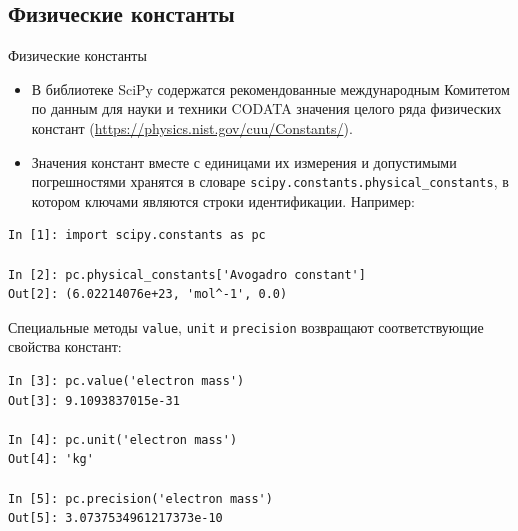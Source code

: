 \documentclass[aspectratio=169, mathserif]{beamer}	%
\begin{document}
\subsection{Физические константы}
\begin{frame}[fragile]{Физические константы}
\scriptsize
\begin{itemize}
	\item В библиотеке SciPy содержатся рекомендованные международным Комитетом по данным для науки и техники CODATA значения целого ряда физических констант (\url{https://physics.nist.gov/cuu/Constants/}).
	\item Значения констант вместе с единицами их измерения и допустимыми погрешностями хранятся в словаре \texttt{scipy.constants.physical\_constants}, в котором ключами являются строки идентификации. Например:
\end{itemize}
 
\begin{lstlisting}[language=iPython, numbers=none, frame=none, ]
In [1]: import scipy.constants as pc

In [2]: pc.physical_constants['Avogadro constant']
Out[2]: (6.02214076e+23, 'mol^-1', 0.0)
\end{lstlisting}

Специальные методы \texttt{value}, \texttt{unit} и \texttt{precision} возвращают соответствующие свойства констант:

\begin{lstlisting}[language=iPython, numbers=none, frame=none, ]
In [3]: pc.value('electron mass')
Out[3]: 9.1093837015e-31

In [4]: pc.unit('electron mass')
Out[4]: 'kg'

In [5]: pc.precision('electron mass')
Out[5]: 3.0737534961217373e-10
\end{lstlisting}
\vfil
\end{frame}
\end{document}

